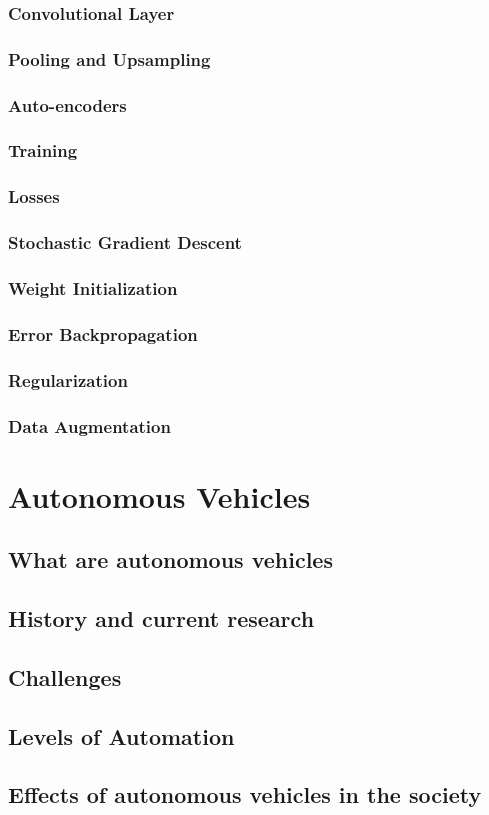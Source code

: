 \subsubsection{Convolutional Layer}
\subsubsection{Pooling and Upsampling}
\subsubsection{Auto-encoders}
\subsubsection{Training}
\subsubsection{Losses}
\subsubsection{Stochastic Gradient Descent}
\subsubsection{Weight Initialization}
\subsubsection{Error Backpropagation}
\subsubsection{Regularization}
\subsubsection{Data Augmentation}



\section{Autonomous Vehicles}
\subsection{What are autonomous vehicles}
\subsection{History and current research}
\subsection{Challenges}
\subsection{Levels	of	Automation}
\subsection{Effects of autonomous vehicles in the society}